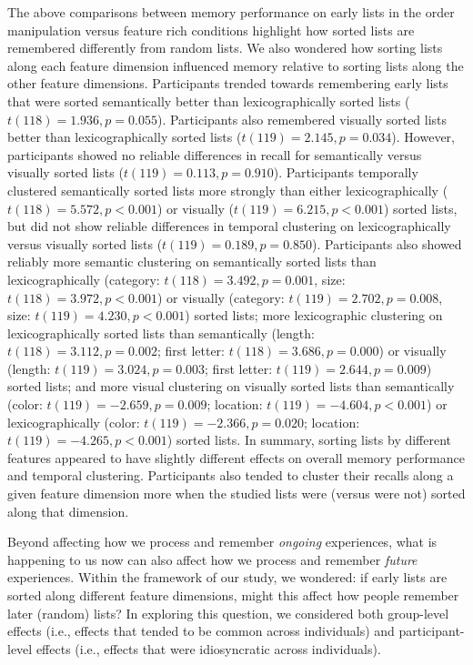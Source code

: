 \documentclass[11pt]{article}
\begin{document}
The above comparisons between memory performance on early lists in the order
manipulation versus feature rich conditions highlight how sorted lists are
remembered differently from random lists. We also wondered how sorting lists
along each feature dimension influenced memory relative to sorting lists along
the other feature dimensions. Participants trended towards remembering early
lists that were sorted semantically better than lexicographically sorted lists
($t(118) = 1.936, p = 0.055$). Participants also remembered visually sorted
lists better than lexicographically sorted lists ($t(119) = 2.145, p = 0.034$).
However, participants showed no reliable differences in recall for semantically
versus visually sorted lists ($t(119) = 0.113, p = 0.910$). Participants
temporally clustered semantically sorted lists more strongly than either
lexicographically ($t(118) = 5.572, p < 0.001$) or visually ($t(119) = 6.215, p
< 0.001$) sorted lists, but did not show reliable differences in temporal
clustering on lexicographically versus visually sorted lists ($t(119) = 0.189,
p = 0.850$). Participants also showed reliably more semantic clustering on
semantically sorted lists than lexicographically (category: $t(118) = 3.492, p
= 0.001$, size: $t(118) = 3.972, p < 0.001$) or visually (category: $t(119) =
2.702, p = 0.008$, size: $t(119) = 4.230, p < 0.001$) sorted lists; more
lexicographic clustering on lexicographically sorted lists than semantically
(length: $t(118) = 3.112, p = 0.002$; first letter: $t(118) = 3.686, p =
0.000$) or visually (length: $t(119) = 3.024, p = 0.003$; first letter: $t(119)
= 2.644, p = 0.009$) sorted lists; and more visual clustering on visually
sorted lists than semantically (color: $t(119) = -2.659, p = 0.009$; location:
$t(119) = -4.604, p < 0.001$) or lexicographically (color: $t(119) = -2.366, p
= 0.020$; location: $t(119) = -4.265, p < 0.001$) sorted lists. In summary,
sorting lists by different features appeared to have slightly different effects
on overall memory performance and temporal clustering.  Participants also tended to
cluster their recalls along a given feature dimension more when the studied
lists were (versus were not) sorted along that dimension.

Beyond affecting how we process and remember \textit{ongoing} experiences, what
is happening to us now can also affect how we process and remember
\textit{future} experiences. Within the framework of our study, we wondered: if
early lists are sorted along different feature dimensions, might this affect
how people remember later (random) lists? In exploring this question, we
considered both group-level effects (i.e., effects that tended to be common
across individuals) and participant-level effects (i.e., effects that were
idiosyncratic across individuals).
\end{document}

